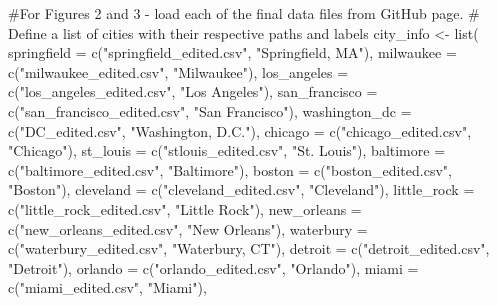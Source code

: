 \documentclass[
  letterpaper,
  DIV=11,
  numbers=noendperiod]{scrartcl}
\newenvironment{Shaded}{\begin{snugshade}}{\end{snugshade}}
\newcommand{\AttributeTok}[1]{\textcolor[rgb]{0.40,0.45,0.13}{#1}}
\newcommand{\CommentTok}[1]{\textcolor[rgb]{0.37,0.37,0.37}{#1}}
\newcommand{\FunctionTok}[1]{\textcolor[rgb]{0.28,0.35,0.67}{#1}}
\newcommand{\NormalTok}[1]{\textcolor[rgb]{0.00,0.23,0.31}{#1}}
\newcommand{\OtherTok}[1]{\textcolor[rgb]{0.00,0.23,0.31}{#1}}
\newcommand{\StringTok}[1]{\textcolor[rgb]{0.13,0.47,0.30}{#1}}
\begin{document}
\begin{Shaded}
\begin{Highlighting}[]
\CommentTok{\#For Figures 2 and 3 {-} load each of the final data files from GitHub page.}
\CommentTok{\# Define a list of cities with their respective paths and labels}
\NormalTok{city\_info }\OtherTok{\textless{}{-}} \FunctionTok{list}\NormalTok{(}
  \AttributeTok{springfield     =} \FunctionTok{c}\NormalTok{(}\StringTok{"springfield\_edited.csv"}\NormalTok{, }\StringTok{"Springfield, MA"}\NormalTok{),}
  \AttributeTok{milwaukee       =} \FunctionTok{c}\NormalTok{(}\StringTok{"milwaukee\_edited.csv"}\NormalTok{, }\StringTok{"Milwaukee"}\NormalTok{),}
  \AttributeTok{los\_angeles     =} \FunctionTok{c}\NormalTok{(}\StringTok{"los\_angeles\_edited.csv"}\NormalTok{, }\StringTok{"Los Angeles"}\NormalTok{),}
  \AttributeTok{san\_francisco   =} \FunctionTok{c}\NormalTok{(}\StringTok{"san\_francisco\_edited.csv"}\NormalTok{, }\StringTok{"San Francisco"}\NormalTok{),}
  \AttributeTok{washington\_dc   =} \FunctionTok{c}\NormalTok{(}\StringTok{"DC\_edited.csv"}\NormalTok{, }\StringTok{"Washington, D.C."}\NormalTok{),}
  \AttributeTok{chicago         =} \FunctionTok{c}\NormalTok{(}\StringTok{"chicago\_edited.csv"}\NormalTok{, }\StringTok{"Chicago"}\NormalTok{),}
  \AttributeTok{st\_louis        =} \FunctionTok{c}\NormalTok{(}\StringTok{"stlouis\_edited.csv"}\NormalTok{, }\StringTok{"St. Louis"}\NormalTok{),}
  \AttributeTok{baltimore       =} \FunctionTok{c}\NormalTok{(}\StringTok{"baltimore\_edited.csv"}\NormalTok{, }\StringTok{"Baltimore"}\NormalTok{),}
  \AttributeTok{boston          =} \FunctionTok{c}\NormalTok{(}\StringTok{"boston\_edited.csv"}\NormalTok{, }\StringTok{"Boston"}\NormalTok{),}
  \AttributeTok{cleveland       =} \FunctionTok{c}\NormalTok{(}\StringTok{"cleveland\_edited.csv"}\NormalTok{, }\StringTok{"Cleveland"}\NormalTok{),}
  \AttributeTok{little\_rock     =} \FunctionTok{c}\NormalTok{(}\StringTok{"little\_rock\_edited.csv"}\NormalTok{, }\StringTok{"Little Rock"}\NormalTok{),}
  \AttributeTok{new\_orleans     =} \FunctionTok{c}\NormalTok{(}\StringTok{"new\_orleans\_edited.csv"}\NormalTok{, }\StringTok{"New Orleans"}\NormalTok{),}
  \AttributeTok{waterbury       =} \FunctionTok{c}\NormalTok{(}\StringTok{"waterbury\_edited.csv"}\NormalTok{, }\StringTok{"Waterbury, CT"}\NormalTok{),}
  \AttributeTok{detroit         =} \FunctionTok{c}\NormalTok{(}\StringTok{"detroit\_edited.csv"}\NormalTok{, }\StringTok{"Detroit"}\NormalTok{),}
  \AttributeTok{orlando         =} \FunctionTok{c}\NormalTok{(}\StringTok{"orlando\_edited.csv"}\NormalTok{, }\StringTok{"Orlando"}\NormalTok{),}
  \AttributeTok{miami           =} \FunctionTok{c}\NormalTok{(}\StringTok{"miami\_edited.csv"}\NormalTok{, }\StringTok{"Miami"}\NormalTok{),}

\end{Highlighting}
\end{Shaded}
\end{document}
